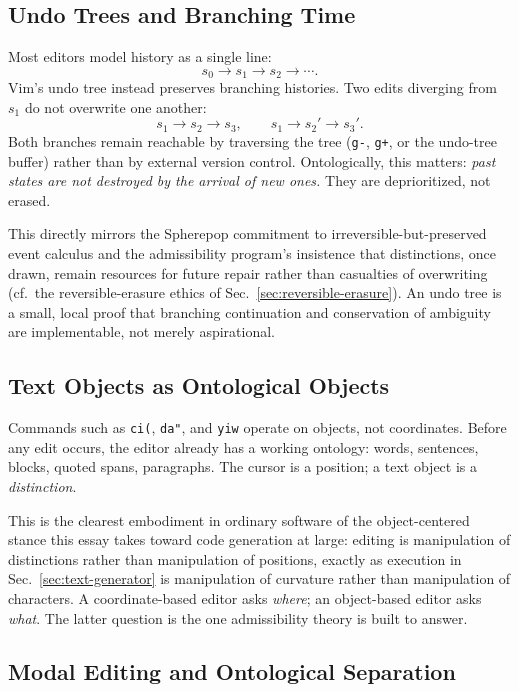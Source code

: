 \documentclass[12pt,a4paper]{article}
\theoremstyle{plain}
\theoremstyle{definition}
\theoremstyle{remark}
\begin{document}
\subsection{Undo Trees and Branching Time}
\label{subsec:undo-trees}

Most editors model history as a single line:
\[
s_0 \to s_1 \to s_2 \to \cdots.
\]
Vim's undo tree instead preserves branching histories. Two edits diverging from $s_1$ do not overwrite one another:
\[
s_1 \to s_2 \to s_3, \qquad s_1 \to s_2' \to s_3'.
\]
Both branches remain reachable by traversing the tree (\verb|g-|, \verb|g+|, or the undo-tree buffer) rather than by external version control. Ontologically, this matters: \emph{past states are not destroyed by the arrival of new ones.} They are deprioritized, not erased.

This directly mirrors the Spherepop commitment to irreversible-but-preserved event calculus and the admissibility program's insistence that distinctions, once drawn, remain resources for future repair rather than casualties of overwriting (cf.\ the reversible-erasure ethics of Sec.~\ref{sec:reversible-erasure}). An undo tree is a small, local proof that branching continuation and conservation of ambiguity are implementable, not merely aspirational.

\subsection{Text Objects as Ontological Objects}
\label{subsec:text-objects}

Commands such as \verb|ci(|, \verb|da"|, and \verb|yiw| operate on objects, not coordinates. Before any edit occurs, the editor already has a working ontology: words, sentences, blocks, quoted spans, paragraphs. The cursor is a position; a text object is a \emph{distinction}.

This is the clearest embodiment in ordinary software of the object-centered stance this essay takes toward code generation at large: editing is manipulation of distinctions rather than manipulation of positions, exactly as execution in Sec.~\ref{sec:text-generator} is manipulation of curvature rather than manipulation of characters. A coordinate-based editor asks \emph{where}; an object-based editor asks \emph{what}. The latter question is the one admissibility theory is built to answer.

\subsection{Modal Editing and Ontological Separation}
\label{subsec:modal-editing}
\end{document}
